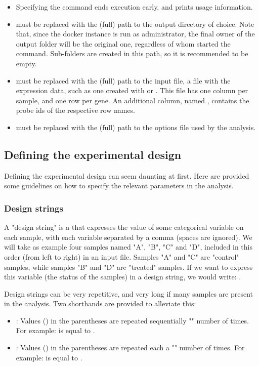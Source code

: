 \begin{itemize}
    \item Specifying the  command ends execution early, and prints usage information.
    \item {} must be replaced with the (full) path to the output directory of choice. Note that, since the docker instance is run as administrator, the final owner of the output folder will be the original one, regardless of whom started the command. Sub-folders are created in this path, so it is recommended to be empty.
    \item {} must be replaced with the (full) path to the input file, a  file with the expression data, such as one created with  or . This file has one column per sample, and one row per gene. An additional column, named , contains the probe ids of the respective row names.
    \item {} must be replaced with the (full) path to the options file used by the analysis.
\end{itemize}

\subsection{Defining the experimental design}
\label{exprdesign}

Defining the experimental design can seem daunting at first. Here are provided some guidelines on how to specify the relevant parameters in the analysis.

\subsubsection{Design strings}
A "design string" is a  that expresses the value of some categorical variable on each sample, with each variable separated by a comma (spaces are ignored). We will take as example four samples named "A", "B", "C" and "D", included in this order (from left to right) in an input file. Samples "A" and "C" are "control" samples, while samples "B" and "D" are "treated" samples. If we want to express this variable (the status of the samples) in a design string, we would write: .

Design strings can be very repetitive, and very long if many samples are present in the analysis. Two shorthands are provided to alleviate this:
\begin{itemize}
    \item {}: Values () in the parentheses are repeated sequentially "" number of times. For example:  is equal to .
    \item {}: Values () in the parentheses are repeated each a "" number of times. For example:  is equal to .
\end{itemize}

